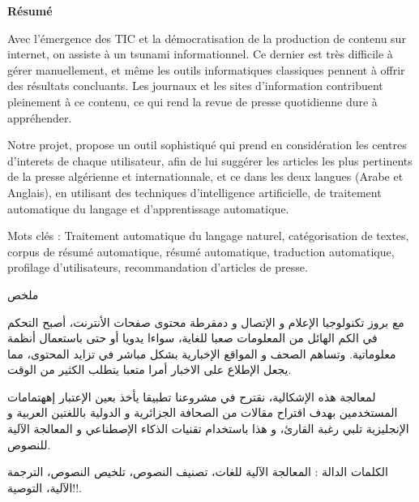 \begin{center}
    \Large 
    \textbf{Résumé}
\end{center}

Avec l'émergence des TIC et la démocratisation de la production de contenu sur internet, on assiste à un tsunami informationnel. Ce dernier est très difficile à gérer manuellement, et même les outils informatiques classiques pennent à offrir des résultats concluants. Les journaux et les sites d'information contribuent pleinement à ce contenu, ce qui rend la revue de presse quotidienne dure à appréhender. 

Notre projet, propose un outil sophistiqué qui prend en considération les centres d'interets de chaque utilisateur, afin de lui suggérer les articles les plus pertinents de la presse algérienne et internationnale, et ce dans les deux langues (Arabe et Anglais), en utilisant des techniques d'intelligence artificielle, de traitement automatique du langage et d'apprentissage automatique. 

\noindent
Mots clés : Traitement automatique du langage naturel, catégorisation de textes, corpus de résumé
automatique, résumé automatique, traduction automatique, profilage d'utilisateurs, recommandation d'articles de presse.  

\vspace*{0.8cm}

\begin{center}
    \Large 
    \begin{arab}
    ملخص
    \end{arab}
\end{center}
\begin{arab}
مع بروز تكنولوجيا الإعلام و الإتصال و دمقرطة محتوى صفحات الأنترنت، أصبح التحكم في الكم الهائل من المعلومات صعبا للغاية، سواءا يدويا أو حتى باستعمال أنظمة معلوماتية. وتساهم الصحف و المواقع الإخبارية بشكل مباشر في تزايد المحتوى، مما يجعل الإطلاع على الاخبار أمرا متعبا يتطلب الكثير من الوقت. 

لمعالجة هذه الإشكالية، نقترح في مشروعنا تطبيقا يأخذ بعين الإعتبار إههتمامات المستخدمين بهدف اقتراح مقالات من الصحافة الجزائرية و الدولية باللغتين العربية و الإنجليزية تلبي رغبة القارئ، و هذا باستخدام تقنيات الذكاء الإصطناعي و المعالجة الآلية للنصوص.

الكلمات الدالة : المعالجة الآلية للغات،  تصنيف النصوص، تلخيص النصوص، الترجمة الآلية، التوصية!!.  
\end{arab}

\vspace*{0.8cm}


